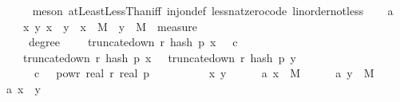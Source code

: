 \begin{isabellebody}
\ \ \ \ \isamarkupfalse%
\ {\isacharparenleft}{\kern0pt}meson\ atLeastLessThan{\isacharunderscore}{\kern0pt}iff\ inj{\isacharunderscore}{\kern0pt}on{\isacharunderscore}{\kern0pt}def\ less{\isacharunderscore}{\kern0pt}nat{\isacharunderscore}{\kern0pt}zero{\isacharunderscore}{\kern0pt}code\ linorder{\isacharunderscore}{\kern0pt}not{\isacharunderscore}{\kern0pt}less{\isacharparenright}{\kern0pt}\isanewline
\isanewline
\ \ \isamarkupfalse%
\ a{}{\isacharcolon}{\kern0pt}\ \isanewline
\ \ \ \ {\isachardoublequoteopen}{\isasymAnd}x\ y{\isachardot}{\kern0pt}\ x\ {\isacharless}{\kern0pt}\ y\ {\isasymLongrightarrow}\ x\ {\isasymin}\ M\ {\isasymLongrightarrow}\ y\ {\isasymin}\ M\ {\isasymLongrightarrow}\ measure\ {\isasymOmega}\ \isanewline
\ \ \ \ {\isacharbraceleft}{\kern0pt}{\isasymomega}{\isachardot}{\kern0pt}\ degree\ {\isasymomega}\ {\isasymge}\ {}\ {\isasymand}\ truncate{\isacharunderscore}{\kern0pt}down\ r\ {\isacharparenleft}{\kern0pt}hash\ p\ x\ {\isasymomega}{\isacharparenright}{\kern0pt}\ {\isasymle}\ c\ {\isasymand}\isanewline
\ \ \ \ truncate{\isacharunderscore}{\kern0pt}down\ r\ {\isacharparenleft}{\kern0pt}hash\ p\ x\ {\isasymomega}{\isacharparenright}{\kern0pt}\ {\isacharequal}{\kern0pt}\ truncate{\isacharunderscore}{\kern0pt}down\ r\ {\isacharparenleft}{\kern0pt}hash\ p\ y\ {\isasymomega}{\isacharparenright}{\kern0pt}{\isacharbraceright}{\kern0pt}\ {\isasymle}\ \isanewline
\ \ \ \ {}{}\ {\isacharasterisk}{\kern0pt}\ c\ {\isacharasterisk}{\kern0pt}\ {}\ powr\ {\isacharparenleft}{\kern0pt}{\isacharminus}{\kern0pt}real\ r{\isacharparenright}{\kern0pt}\ {\isacharslash}{\kern0pt}{\isacharparenleft}{\kern0pt}real\ p{\isacharparenright}{\kern0pt}\isanewline
\ \ \isamarkupfalse%
\ {\isacharminus}{\kern0pt}\isanewline
\ \ \ \ \isamarkupfalse%
\ x\ y\isanewline
\ \ \ \ \isamarkupfalse%
\ a{}{\isacharunderscore}{\kern0pt}{}{\isacharcolon}{\kern0pt}\ {\isachardoublequoteopen}x\ {\isasymin}\ M{\isachardoublequoteclose}\isanewline
\ \ \ \ \isamarkupfalse%
\ a{}{\isacharunderscore}{\kern0pt}{}{\isacharcolon}{\kern0pt}\ {\isachardoublequoteopen}y\ {\isasymin}\ M{\isachardoublequoteclose}\isanewline
\ \ \ \ \isamarkupfalse%
\ a{}{\isacharunderscore}{\kern0pt}{}{\isacharcolon}{\kern0pt}\ {\isachardoublequoteopen}x\ {\isacharless}{\kern0pt}\ y{\isachardoublequoteclose}\isanewline

\end{isabellebody}
